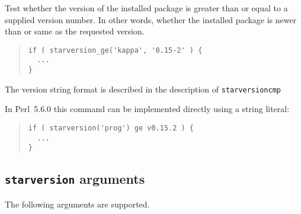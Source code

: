 \documentclass[twoside,11pt]{article}
\newenvironment{myquote}{\begin{quote}\begin{small}}{\end{small}\end{quote}}
\newcommand{\perl}{\xref{\textsf{Perl}}{sun193}{}}
\newcommand{\xref}[3]{#1}
\renewcommand{\_}{\texttt{\symbol{95}}}
\begin{document}
\begin{description}
Test whether the version of the installed package is greater than
or equal to a supplied version number. In other words, whether the installed
package is newer than or same as the requested version.

\begin{myquote}
\begin{verbatim}
if ( starversion_ge('kappa', '0.15-2' ) {
  ...
}
\end{verbatim}
\end{myquote}

The version string format is described in the description of
\texttt{starversion\_cmp}



In \perl\ 5.6.0 this command can be implemented directly using a
string literal:

\begin{myquote}
\begin{verbatim}
if ( starversion('prog') ge v0.15.2 ) {
  ...
}
\end{verbatim}
\end{myquote}

\end{description}

\subsection{\texttt{starversion} arguments\label{starversion}}

The following arguments are supported.
\end{document}
